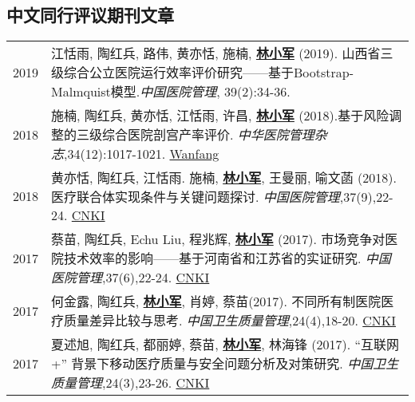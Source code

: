 \documentclass{resume}
\begin{document}
\subsection*{\textbf{中文同行评议期刊文章}}
\begin{longtable}{r p{14cm}}

2019 & 江恬雨, 陶红兵, 路伟, 黄亦恬, 施楠, \underline{\textbf{林小军}} (2019). 山西省三级综合公立医院运行效率评价研究——基于Bootstrap-Malmquist模型.\emph{中国医院管理}, 39(2):34-36.\\[5pt]

2018 & 施楠, 陶红兵, 黄亦恬, 江恬雨, 许昌, \underline{\textbf{林小军}} (2018).基于风险调整的三级综合医院剖宫产率评价. \emph{中华医院管理杂志},34(12):1017-1021. \href{http://www.wanfangdata.com.cn/details/detail.do?_type=perio&id=zhyygl201812011}{Wanfang} \\[5pt]

2018 & 黄亦恬, 陶红兵, 江恬雨. 施楠, \underline{\textbf{林小军}}, 王曼丽, 喻文菡 (2018). 医疗联合体实现条件与关键问题探讨. \emph{中国医院管理},37(9),22-24. \href{http://kns.cnki.net/KCMS/detail/detail.aspx?dbcode=CJFQ&dbname=CJFDLAST2018&filename=YYGL201809005&v=MjIxMjdlWnVadEZpRGxWNzNPUERUTVlyRzRIOW5NcG85RllZUjhlWDFMdXhZUzdEaDFUM3FUcldNMUZyQ1VSTEs=}{CNKI} \\[5pt]

2017 & 蔡苗, 陶红兵, Echu Liu, 程兆辉, \underline{\textbf{林小军}} (2017). 市场竞争对医院技术效率的影响——基于河南省和江苏省的实证研究. \emph{中国医院管理},37(6),22-24. \href{http://kns.cnki.net/KCMS/detail/detail.aspx?dbcode=CJFQ&dbname=CJFDLAST2017&filename=YYGL201706012&v=MzEzMTREbFZMdkFQRFRNWXJHNEg5Yk1xWTlFWm9SOGVYMUx1eFlTN0RoMVQzcVRyV00xRnJDVVJMS2VadVp0Rmk=}{CNKI}\\[5pt]

2017 & 何金露, 陶红兵, \underline{\textbf{林小军}}, 肖婷, 蔡苗(2017). 不同所有制医院医疗质量差异比较与思考. \emph{中国卫生质量管理},24(4),18-20. \href{http://kns.cnki.net/KCMS/detail/detail.aspx?dbcode=CJFQ&dbname=CJFDLAST2017&filename=WSJG201704010&v=MTU5NzM0OUVaSVI4ZVgxTHV4WVM3RGgxVDNxVHJXTTFGckNVUkxLZVp1WnRGaURtVTcvTU1qN0JhYkc0SDliTXE=}{CNKI}\\[5pt]

2017 & 夏述旭, 陶红兵, 都丽婷, 蔡苗, \underline{\textbf{林小军}}, 林海锋 (2017). “互联网+” 背景下移动医疗质量与安全问题分析及对策研究. \emph{中国卫生质量管理},24(3),23-26. \href{http://kns.cnki.net/KCMS/detail/detail.aspx?dbcode=CJFQ&dbname=CJFDLAST2017&filename=WSJG201703030&v=MjQwMTVHWklSOGVYMUx1eFlTN0RoMVQzcVRyV00xRnJDVVJMS2VadVp0RmlEbVViL01NajdCYWJHNEg5Yk1ySTk=}{CNKI}\\[5pt]


\end{longtable}
\end{document}
